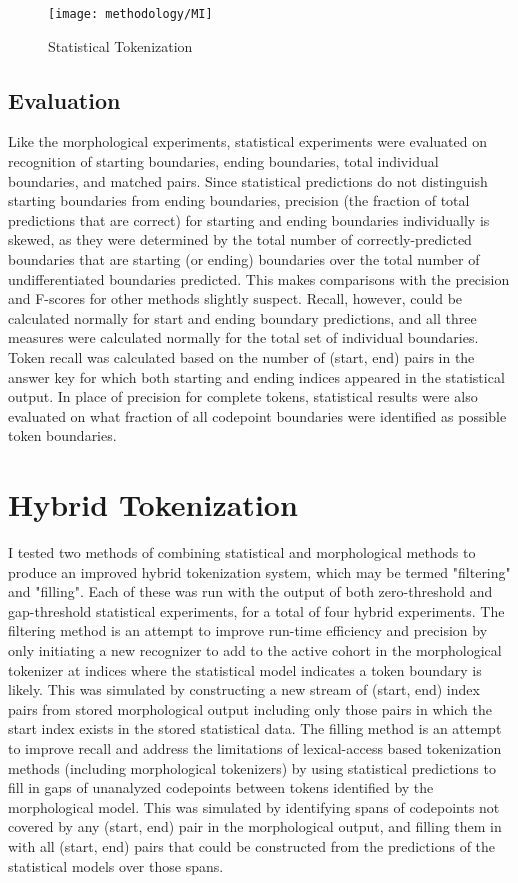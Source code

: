 \begin{figure}[h!]
	\texttt{[image: methodology/MI]}
	\caption{Statistical Tokenization}
	\label{statdiagram}
\end{figure}

\subsection{Evaluation}
Like the morphological experiments, statistical experiments were evaluated on recognition of starting boundaries, ending boundaries, total individual boundaries, and matched pairs.
Since statistical predictions do not distinguish starting boundaries from ending boundaries, precision (the fraction of total predictions that are correct)  for starting and ending boundaries individually is skewed, as they were determined by the total number of correctly-predicted boundaries that are starting (or ending) boundaries over the total number of undifferentiated boundaries predicted. This makes comparisons with the precision and F-scores for other methods slightly suspect. Recall, however, could be calculated normally for start and ending boundary predictions, and all three measures were calculated normally for the total set of individual boundaries.
Token recall was calculated based on the number of (start, end) pairs in the answer key for which both starting and ending indices appeared in the statistical output. In place of precision for complete tokens, statistical results were also evaluated on what fraction of all codepoint boundaries were identified as possible token boundaries.

\section{Hybrid Tokenization}
I tested two methods of combining statistical and morphological methods to produce an improved hybrid tokenization system, which may be termed "filtering" and "filling". Each of these was run with the output of both zero-threshold and gap-threshold statistical experiments, for a total of four hybrid experiments.
The filtering method is an attempt to improve run-time efficiency and precision by only initiating a new recognizer to add to the active cohort in the morphological tokenizer at indices where the statistical model indicates a token boundary is likely. This was simulated by constructing a new stream of (start, end) index pairs from stored morphological output including only those pairs in which the start index exists in the stored statistical data.
The filling method is an attempt to improve recall and address the limitations of lexical-access based tokenization methods (including morphological tokenizers) by using statistical predictions to fill in gaps of unanalyzed codepoints between tokens identified by the morphological model. This was simulated by identifying spans of codepoints not covered by any (start, end) pair in the morphological output, and filling them in with all (start, end) pairs that could be constructed from the predictions of the statistical models over those spans.

